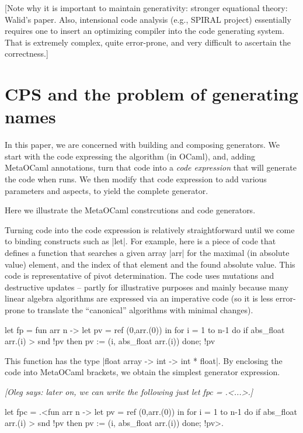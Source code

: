 \documentclass[11pt]{llncs}
\newcommand{\oleg}[1]{{\it [Oleg says: #1]}}
\begin{document}
[Note why it is important to maintain generativity: stronger
equational theory: Walid's paper. Also, intensional code analysis
(e.g., SPIRAL project) essentially requires one to insert an
optimizing compiler into the code generating system. That is extremely
complex, quite error-prone, and very difficult to ascertain the
correctness.]

\section{CPS and the problem of generating names}

In this paper, we are concerned with building and composing
generators. We start with the code expressing the algorithm (in
OCaml), and, adding MetaOCaml annotations, turn that code into a
\emph{code expression} that will generate the code when runs. We then
modify that code expression to add various parameters and aspects, to
yield the complete generator.

Here we illustrate the MetaOCaml constrcutions and code generators.

Turning code into the code expression is relatively straightforward
until we come to binding constructs such as |let|. For example, here
is a piece of code that defines a function that searches a given array
|arr| for the maximal (in absolute value) element, and the index of
that element and the found absolute value. This code is representative
of pivot determination. The code uses mutations and destructive
updates -- partly for illustrative purposes and mainly because many
linear algebra algorithms are expressed via an imperative code (so it
is less error-prone to translate the ``canonical'' algorithms with
minimal changes).

\begin{code}
let fp = fun arr n ->
   let pv = ref (0,arr.(0)) in
   for i = 1 to n-1 do
     if abs_float arr.(i) > snd !pv then
        pv := (i, abs_float arr.(i))
   done;
   !pv
\end{code}

This function has the type |float array -> int -> int * float|. By
enclosing the code into MetaOCaml brackets, we obtain the simplest
generator expression.

\oleg{later on, we can write the following just let fpc = .<...>.}

\begin{code}
let fpc = .<fun arr n ->
   let pv = ref (0,arr.(0)) in
   for i = 1 to n-1 do
     if abs_float arr.(i) > snd !pv then
        pv := (i, abs_float arr.(i))
   done;
   !pv>.
\end{code}
\end{document}
